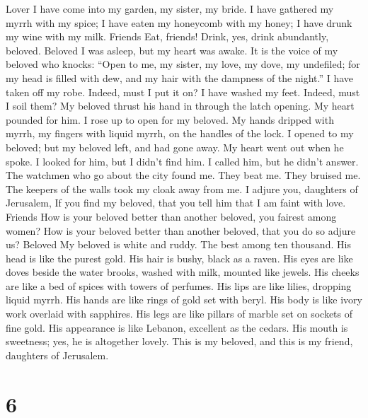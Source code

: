 Lover  I have come into my garden, my sister, my bride. I
have gathered my myrrh with my spice; I have eaten my honeycomb with my
honey; I have drunk my wine with my milk. Friends Eat, friends! Drink,
yes, drink abundantly, beloved. Beloved  I was asleep, but
my heart was awake. It is the voice of my beloved who knocks: ``Open to
me, my sister, my love, my dove, my undefiled; for my head is filled
with dew, and my hair with the dampness of the night.''  I
have taken off my robe. Indeed, must I put it on? I have washed my feet.
Indeed, must I soil them?  My beloved thrust his hand in
through the latch opening. My heart pounded for him.  I
rose up to open for my beloved. My hands dripped with myrrh, my fingers
with liquid myrrh, on the handles of the lock.  I opened
to my beloved; but my beloved left, and had gone away. My heart went out
when he spoke. I looked for him, but I didn't find him. I called him,
but he didn't answer.  The watchmen who go about the city
found me. They beat me. They bruised me. The keepers of the walls took
my cloak away from me.  I adjure you, daughters of
Jerusalem, If you find my beloved, that you tell him that I am faint
with love. Friends  How is your beloved better than
another beloved, you fairest among women? How is your beloved better
than another beloved, that you do so adjure us? Beloved 
My beloved is white and ruddy. The best among ten thousand.
 His head is like the purest gold. His hair is bushy,
black as a raven.  His eyes are like doves beside the
water brooks, washed with milk, mounted like jewels.  His
cheeks are like a bed of spices with towers of perfumes. His lips are
like lilies, dropping liquid myrrh.  His hands are like
rings of gold set with beryl. His body is like ivory work overlaid with
sapphires.  His legs are like pillars of marble set on
sockets of fine gold. His appearance is like Lebanon, excellent as the
cedars.  His mouth is sweetness; yes, he is altogether
lovely. This is my beloved, and this is my friend, daughters of
Jerusalem.

\hypertarget{section-5}{%
\section{6}\label{section-5}}

